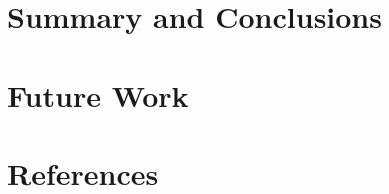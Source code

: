 \documentclass[xcolor=dvipsnames,dvip,notes=show,table]{beamer}
\begin{document}
\section{Summary and Conclusions}

\frame{
\titlepage

}



\section{Future Work}

\frame{
\titlepage

}



\nocite{*}

\appendix
\section*{References}


% 
% 
% 
\end{document}
